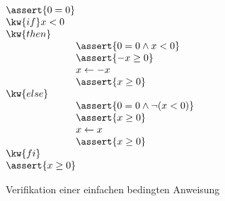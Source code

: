 \begin{figure}[ht]
  \centering
  $\begin{alignedat}{2}
    &\assert{0=0}  \\[-1mm]
    &\kw{if } x<0 \\[-1mm]
    &\kw{then } \\[-1mm]
    &&&\assert{0=0 \land  x<0} \\[-1mm]
    &&&\assert{-x \geq 0} \\[-1mm]
    &&& x \gets -x  \\[-1mm]
    &&&\assert{x\geq 0} \\[-1mm]
    &\kw{else } \\[-1mm]
    &&&\assert{0=0 \land  \lnot (x<0)} \\[-1mm]
    &&&\assert{x \geq 0} \\[-1mm]
    &&& x \gets x  \\[-1mm]
    &&&\assert{x\geq 0} \\[-1mm]
    &\kw{fi } \\[-1mm]
    &\assert{x\geq 0}
  \end{alignedat}$
  \caption{Verifikation einer einfachen bedingten Anweisung}
  \label{fig:hoare-abs-x}
\end{figure}


